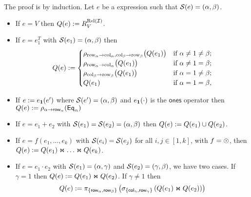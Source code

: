 The proof is by induction. Let $e$ be a \langsum expression such that $\mathcal{S} (e)=(\alpha, \beta)$.
\begin{itemize}
  \item If $e=V$ then $Q (e):=R_V^{\text{Rel}(\mathcal{I})}$.

  \item If $e=e_1^T$ with $\mathcal{S} (e_1)=(\alpha, \beta)$ then \[
Q(e) :=
\begin{cases}
\rho_{\mathrm{row}_\alpha \to \mathrm{col}_\alpha,\mathrm{col}_\beta \to \mathrm{row}_\beta}\bigl(Q(e_1)\bigr) & \text{if } \alpha \neq 1 \neq \beta; \cr
\rho_{\mathrm{row}_\alpha \to \mathrm{col}_\alpha}\bigl(Q(e_1)\bigr) & \text{if } \alpha \neq 1 = \beta; \cr
\rho_{\mathrm{col}_\beta \to \mathrm{row}_\beta}\bigl(Q(e_1)\bigr) & \text{if } \alpha = 1 \neq \beta; \cr
Q(e_1) & \text{if } \alpha = 1 = \beta,
\end{cases}
\]

  \item If $e:=e_{\mathbf{1}}(e')$ where $\mathcal{S}(e')=(\alpha, \beta)$ and $e_{\mathbf{1}}(\cdot)$ is the $\mathsf{ones}$ operator
  then $Q(e):=\rho_{\alpha\rightarrow\mathsf{row}_\alpha}(\mathsf{Eq}_{\alpha})$

  \item If $e=e_1+e_2$ with $\mathcal{S} (e_1)=\mathcal{S} (e_2)=(\alpha, \beta)$ then $Q (e):=Q (e_1)\cup Q (e_2)$.

  \item If $e=f(e_1,\ldots, e_k)$ with $\mathcal{S}(e_i)=\mathcal{S}(e_j)$ for all $i,j\in[1,k]$, with $f=\odot$, then $Q(e):=Q(e_1)\Join \ldots \Join Q(e_k)$.

  \item If $e=e_1\cdot e_2$ with $\mathcal{S} (e_1)=(\alpha, \gamma)$ and $\mathcal{S} (e_2)=(\gamma, \beta)$, we have two cases. If $\gamma = 1$ then $Q (e):=Q (e_1)\Join Q (e_2)$.
If $\gamma\neq 1$ then
$$
Q (e) := \pi_{\lbrace \mathsf{row}_{\alpha},\mathsf{row}_{\beta} \rbrace}\left( \sigma_{\lbrace \mathsf{col}_\gamma, \mathsf{row}_\gamma \rbrace} \left( Q (e_1)\Join Q (e_2) \right) \right)
$$


\end{itemize}
